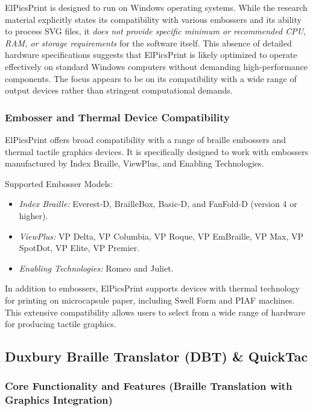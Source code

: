 ElPicsPrint is designed to run on Windows operating systems. While the research material explicitly states its compatibility with various embossers and its ability to process SVG files, it \emph{does not provide specific minimum or recommended CPU, RAM, or storage requirements} for the software itself.\cite{TactileViewIrie,DuxburyDetails} This absence of detailed hardware specifications suggests that ElPicsPrint is likely optimized to operate effectively on standard Windows computers without demanding high-performance components. The focus appears to be on its compatibility with a wide range of output devices rather than stringent computational demands.

\subsubsection{Embosser and Thermal Device Compatibility}

ElPicsPrint offers broad compatibility with a range of braille embossers and thermal tactile graphics devices. It is specifically designed to work with embossers manufactured by Index Braille, ViewPlus, and Enabling Technologies.\cite{TactileViewIrie}

Supported Embosser Models:
\begin{itemize}
    \item \emph{Index Braille:} Everest-D, BrailleBox, Basic-D, and FanFold-D (version 4 or higher).\cite{TactileViewIrie,DuxburyDetails}
    \item \emph{ViewPlus:} VP Delta, VP Columbia, VP Roque, VP EmBraille, VP Max, VP SpotDot, VP Elite, VP Premier.\cite{TactileViewIrie,DuxburyDetails}
    \item \emph{Enabling Technologies:} Romeo and Juliet.\cite{TactileViewIrie,DuxburyDetails}
\end{itemize}

In addition to embossers, ElPicsPrint supports devices with thermal technology for printing on microcapsule paper, including Swell Form and PIAF machines.\cite{TactileViewIrie} This extensive compatibility allows users to select from a wide range of hardware for producing tactile graphics.

\subsection{Duxbury Braille Translator (DBT) \& QuickTac}

\subsubsection{Core Functionality and Features (Braille Translation with Graphics Integration)}

